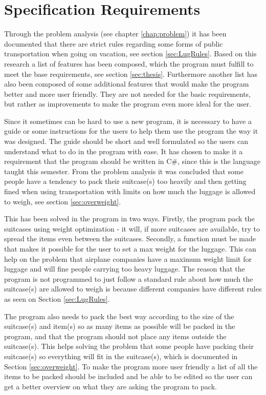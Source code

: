 \section{Specification Requirements}
\label{sec:Spec}
Through the problem analysis (see chapter \ref{chap:problem}) it has been documented that there are strict rules regarding some forms of public transportation when going on vacation, see section \ref{sec:LugRules}. Based on this research a list of features has been composed, which the program must fulfill to meet the base requirements, see section \ref{sec:thesis}. Furthermore another list has also been composed of some additional features that would make the program better and more user friendly. They are not needed for the basic requirements, but rather as improvements to make the program even more ideal for the user.

Since it sometimes can be hard to use a new program, it is necessary to have a guide or some instructions for the users to help them use the program the way it was designed. The guide should be short and well formulated so the users can understand what to do in the program with ease.
It has chosen to make it a requirement that the program should be written in C\#, since this is the language taught this semester.
From the problem analysis it was concluded that some people have a tendency to pack their suitcase(s) too heavily and then getting fined when using transportation with limits on how much the luggage is allowed to weigh, see section \ref{sec:overweight}. 

This has been solved in the program in two ways. 
Firstly, the program pack the suitcases using weight optimization - it will, if more suitcases are available, try to spread the items even between the suitcases. 
Secondly, a function must be made that makes it possible for the user to set a max weight for the luggage. This can help on the problem that airplane companies have a maximum weight limit for luggage and will fine people carrying too heavy luggage. The reason that the program is not programmed to just follow a standard rule about how much the suitcase(s) are allowed to weigh is because different companies have different rules as seen on Section \ref{sec:LugRules}.

The program also needs to pack the best way according to the size of the suitcase(s) and item(s) so as many items as possible will be packed in the program, and that the program should not place any items outside the suitcase(s). This helps solving the problem that some people have packing their suitcase(s) so everything will fit in the suitcase(s), which is documented in Section \ref{sec:overweight}.
To make the program more user friendly a list of all the items to be packed should be included and be able to be edited so the user can get a better overview on what they are asking the program to pack.

